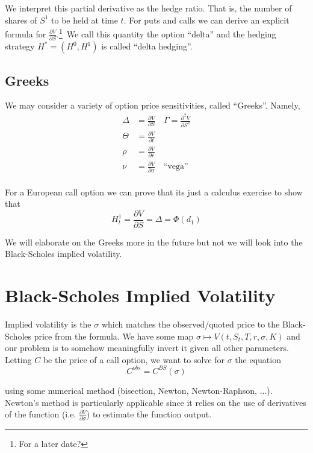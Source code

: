 \documentclass[12pt]{article}
\newlength\tindent
\renewcommand{\indent}{\hspace*{\tindent}}
\begin{document}
\indent We interpret this partial derivative as the hedge ratio. That is, the number of shares of $S^1$ to be held at time $t$. For puts and calls we can derive an explicit formula for $\frac{\partial V}{\partial S}$.\footnote{For a later date?}~We call this quantity the option ``delta'' and the hedging strategy $H^* = (H^0, H^1)$ is called ``delta hedging''.

\subsection{Greeks}

We may consider a variety of option price sensitivities, called ``Greeks''. Namely,
\begin{align*}
	\Delta &= \frac{\partial V}{\partial S} \quad \Gamma = \frac{\partial^2 V}{\partial S^2} \\
	\Theta &= \frac{\partial V}{\partial t} \\
	\rho &= \frac{\partial V}{\partial r} \\
	\nu &= \frac{\partial V}{\partial \sigma} \quad \text{``vega''} \\
\end{align*}

For a European call option we can prove that its just a calculus exercise to show that
\begin{equation*}
	H^1_t = \frac{\partial V}{\partial S} = \Delta = \Phi(d_1)
\end{equation*}

We will elaborate on the Greeks more in the future but not we will look into the Black-Scholes implied volatility.

\section{Black-Scholes Implied Volatility}

Implied volatility is the $\sigma$ which matches the observed/quoted price to the Black-Scholes price from the formula. We have some map $\sigma \mapsto V(t,S_t,T,r,\sigma,K)$ and our problem is to somehow meaningfully invert it given all other parameters. Letting $C$ be the price of a call option, we want to solve for $\sigma$ the equation
\begin{equation*}
	C^{obs} = C^{BS}(\sigma)
\end{equation*}

using some numerical method (bisection, Newton, Newton-Raphson, ...). Newton's method is particularly applicable since it relies on the use of derivatives of the function (i.e. $\frac{\partial V}{\partial \sigma}$) to estimate the function output.
\end{document}
